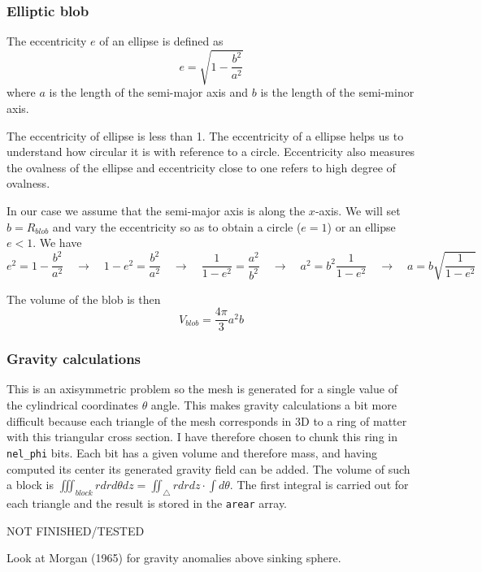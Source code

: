 \subsubsection*{Elliptic blob}

The eccentricity $e$ of an ellipse is defined as 
\[
e=\sqrt{1-\frac{b^2}{a^2}}
\]
where $a$ is the length of the semi-major axis and $b$ is the length of the semi-minor axis.

The eccentricity of ellipse is less than 1. The eccentricity of a ellipse helps us to understand how circular it is with reference to a circle. Eccentricity also measures the ovalness of the ellipse and eccentricity close to one refers to high degree of ovalness.

In our case we assume that the semi-major axis is along the $x$-axis.
We will set $b=R_{blob}$ and vary the eccentricity so as to obtain a circle ($e=1$) or an ellipse $e<1$.
We have
\[
e^2 = 1 -\frac{b^2}{a^2}
\quad
\rightarrow
\quad
1-e^2 = \frac{b^2}{a^2}
\quad
\rightarrow
\quad
\frac{1}{1-e^2} = \frac{a^2}{b^2}
\quad
\rightarrow
\quad
a^2 = b^2 \frac{1}{1-e^2} 
\quad
\rightarrow
\quad
a = b \sqrt{\frac{1}{1-e^2}}
\]

The volume of the blob is then 
\[
V_{blob} = \frac{4\pi}{3}a^2b
\]

 
\subsubsection*{Gravity calculations}

This is an axisymmetric problem so the mesh is generated for a single value of the cylindrical 
coordinates $\theta$ angle. 
This makes gravity calculations a bit more difficult because each triangle of the mesh corresponds
in 3D to a ring of matter with this triangular cross section. 
I have therefore chosen to chunk this ring in {\tt nel\_phi} bits. Each bit has a given volume and therefore
mass, and having computed its center its generated gravity field can be added. 
The volume of such a block is $\iiint_{block} r dr d\theta dz =\iint_\triangle rdrdz \cdot \int d\theta$.  
The first integral is carried out for each triangle and the result is stored in the {\tt arear} array. 

NOT FINISHED/TESTED

Look at Morgan (1965) \cite{morg65} for gravity anomalies above sinking sphere. 




